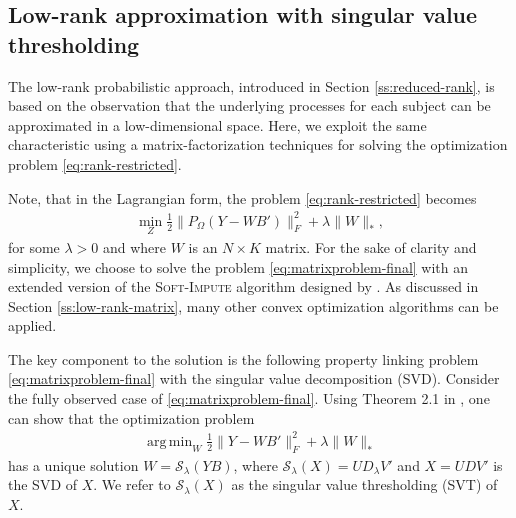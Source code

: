 \documentclass[preprint]{imsart}
\numberwithin{equation}{section}
\theoremstyle{plain}
\newcommand{\cS}{\mathcal{S}}
\DeclareMathOperator*{\argmin}{arg\,min}
\begin{document}
\subsection{Low-rank approximation with singular value thresholding}\label{ss:matrix-factorization}

The low-rank probabilistic approach, introduced in Section \ref{ss:reduced-rank}, is based on the observation that the underlying processes for each subject can be approximated in a low-dimensional space. %
Here, we exploit the same characteristic using a matrix-factorization techniques for solving the optimization problem \eqref{eq:rank-restricted}.

Note, that in the Lagrangian form, the problem \eqref{eq:rank-restricted} becomes
\begin{align}\label{eq:matrixproblem-final}
\min_Z \frac{1}{2} \|P_\Omega(Y - WB')\|_F^2 + \lambda\|W\|_*,
\end{align}
for some $\lambda > 0$ and where $W$ is an $N \times K$ matrix. For the sake of clarity and simplicity, we choose to solve the problem \eqref{eq:matrixproblem-final} with an extended version of the \textsc{Soft-Impute} algorithm designed by \citet{mazumder2010spectral}. As discussed in Section \ref{ss:low-rank-matrix}, many other convex optimization algorithms can be applied.

The key component to the solution is the following property linking problem \eqref{eq:matrixproblem-final} with the singular value decomposition (SVD). Consider the fully observed case of \eqref{eq:matrixproblem-final}. Using Theorem 2.1 in \citet{cai2010singular}, one can show that the optimization problem
\begin{align}\label{eq:optsvd}
\argmin_{W} \frac{1}{2} \| Y - WB' \|_F^2 + \lambda\|W\|_*
\end{align}
has a unique solution $W = \cS_\lambda (YB)$, where $\cS_\lambda(X) = UD_\lambda V'$ and $X = UDV'$ is the SVD of $X$. We refer to $\cS_\lambda(X)$ as the singular value thresholding (SVT) of $X$.
\end{document}

